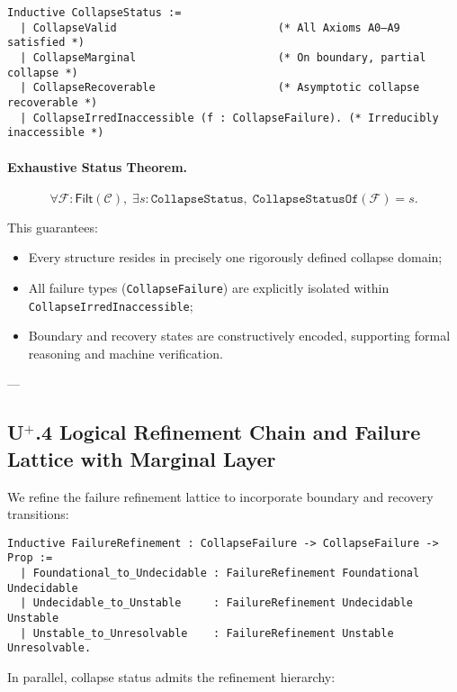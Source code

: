 \documentclass[11pt]{article}
\begin{document}
\begin{lstlisting}[language=Coq]
Inductive CollapseStatus :=
  | CollapseValid                         (* All Axioms A0–A9 satisfied *)
  | CollapseMarginal                      (* On boundary, partial collapse *)
  | CollapseRecoverable                   (* Asymptotic collapse recoverable *)
  | CollapseIrredInaccessible (f : CollapseFailure). (* Irreducibly inaccessible *)
\end{lstlisting}

\paragraph{Exhaustive Status Theorem.}

\[
\forall \mathcal{F} : \mathsf{Filt}(\mathcal{C}),\;
\exists s : \texttt{CollapseStatus},\; \texttt{CollapseStatusOf}(\mathcal{F}) = s.
\]

This guarantees:

\begin{itemize}
    \item Every structure resides in precisely one rigorously defined collapse domain;
    \item All failure types (\texttt{CollapseFailure}) are explicitly isolated within \texttt{CollapseIrredInaccessible};
    \item Boundary and recovery states are constructively encoded, supporting formal reasoning and machine verification.
\end{itemize}

---

\subsection*{U$^{+}$.4 Logical Refinement Chain and Failure Lattice with Marginal Layer}

We refine the failure refinement lattice to incorporate boundary and recovery transitions:

\begin{lstlisting}[language=Coq]
Inductive FailureRefinement : CollapseFailure -> CollapseFailure -> Prop :=
  | Foundational_to_Undecidable : FailureRefinement Foundational Undecidable
  | Undecidable_to_Unstable     : FailureRefinement Undecidable Unstable
  | Unstable_to_Unresolvable    : FailureRefinement Unstable Unresolvable.
\end{lstlisting}

In parallel, collapse status admits the refinement hierarchy:
\end{document}
